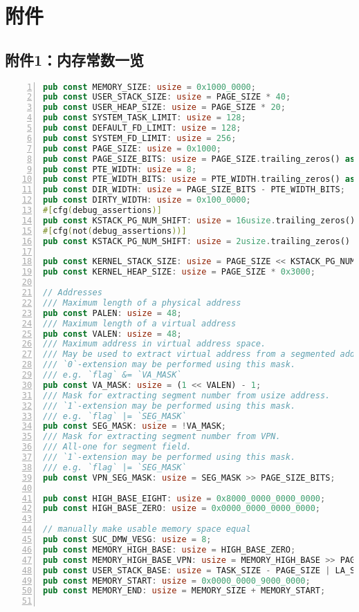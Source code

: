 \documentclass{article}
\begin{document}
\section{附件}
\subsection{附件1：内存常数一览}
\begin{center}
    \begin{lstlisting}[language=RUST,numbers=left]
pub const MEMORY_SIZE: usize = 0x1000_0000;
pub const USER_STACK_SIZE: usize = PAGE_SIZE * 40;
pub const USER_HEAP_SIZE: usize = PAGE_SIZE * 20;
pub const SYSTEM_TASK_LIMIT: usize = 128;
pub const DEFAULT_FD_LIMIT: usize = 128;
pub const SYSTEM_FD_LIMIT: usize = 256;
pub const PAGE_SIZE: usize = 0x1000;
pub const PAGE_SIZE_BITS: usize = PAGE_SIZE.trailing_zeros() as usize;
pub const PTE_WIDTH: usize = 8;
pub const PTE_WIDTH_BITS: usize = PTE_WIDTH.trailing_zeros() as usize;
pub const DIR_WIDTH: usize = PAGE_SIZE_BITS - PTE_WIDTH_BITS;
pub const DIRTY_WIDTH: usize = 0x100_0000;
#[cfg(debug_assertions)]
pub const KSTACK_PG_NUM_SHIFT: usize = 16usize.trailing_zeros() as usize;
#[cfg(not(debug_assertions))]
pub const KSTACK_PG_NUM_SHIFT: usize = 2usize.trailing_zeros() as usize;

pub const KERNEL_STACK_SIZE: usize = PAGE_SIZE << KSTACK_PG_NUM_SHIFT;
pub const KERNEL_HEAP_SIZE: usize = PAGE_SIZE * 0x3000;

// Addresses
/// Maximum length of a physical address
pub const PALEN: usize = 48;
/// Maximum length of a virtual address
pub const VALEN: usize = 48;
/// Maximum address in virtual address space.
/// May be used to extract virtual address from a segmented address
/// `0`-extension may be performed using this mask.
/// e.g. `flag` &= `VA_MASK`
pub const VA_MASK: usize = (1 << VALEN) - 1;
/// Mask for extracting segment number from usize address.
/// `1`-extension may be performed using this mask.
/// e.g. `flag` |= `SEG_MASK`
pub const SEG_MASK: usize = !VA_MASK;
/// Mask for extracting segment number from VPN.
/// All-one for segment field.
/// `1`-extension may be performed using this mask.
/// e.g. `flag` |= `SEG_MASK`
pub const VPN_SEG_MASK: usize = SEG_MASK >> PAGE_SIZE_BITS;

pub const HIGH_BASE_EIGHT: usize = 0x8000_0000_0000_0000;
pub const HIGH_BASE_ZERO: usize = 0x0000_0000_0000_0000;

// manually make usable memory space equal
pub const SUC_DMW_VESG: usize = 8;
pub const MEMORY_HIGH_BASE: usize = HIGH_BASE_ZERO;
pub const MEMORY_HIGH_BASE_VPN: usize = MEMORY_HIGH_BASE >> PAGE_SIZE_BITS;
pub const USER_STACK_BASE: usize = TASK_SIZE - PAGE_SIZE | LA_START;
pub const MEMORY_START: usize = 0x0000_0000_9000_0000;
pub const MEMORY_END: usize = MEMORY_SIZE + MEMORY_START;


\end{lstlisting}
\end{center}
\end{document}
